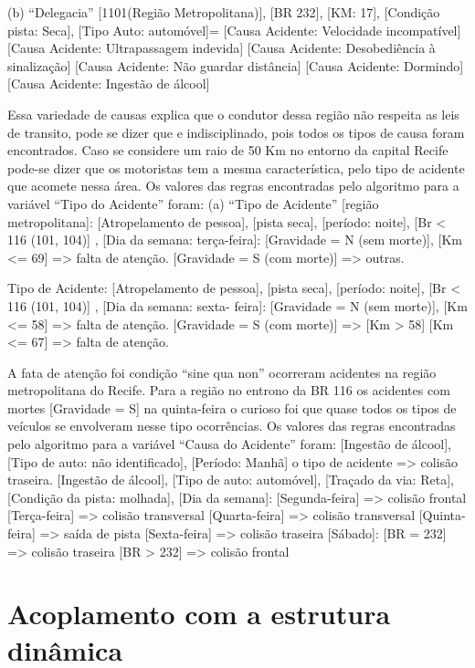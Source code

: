 (b) “Delegacia” [1101(Região Metropolitana)], [BR 232],
[KM: 17], [Condição pista: Seca], [Tipo Auto: automóvel]=
[Causa Acidente: Velocidade incompatível]
[Causa Acidente: Ultrapassagem indevida]
[Causa Acidente: Desobediência à sinalização]
[Causa Acidente: Não guardar distância]
[Causa Acidente: Dormindo]
[Causa Acidente: Ingestão de álcool]

Essa variedade de causas explica que o condutor dessa
região não respeita as leis de transito, pode se dizer que e
indisciplinado, pois todos os tipos de causa foram encontrados.
Caso se considere um raio de 50 Km no entorno da capital Recife pode-se dizer que os motoristas tem a mesma
característica, pelo tipo de acidente que acomete nessa área.
Os valores das regras encontradas pelo algoritmo para a
variável “Tipo do Acidente” foram:
(a) “Tipo de Acidente” [região metropolitana]: [Atropelamento
de pessoa], [pista seca], [período: noite], [Br < 116 (101, 104)]
, [Dia da semana: terça-feira]:
[Gravidade = N (sem morte)], [Km <= 69] => falta de atenção.
[Gravidade = S (com morte)] => outras.

Tipo de Acidente: [Atropelamento de pessoa], [pista seca],
[período: noite], [Br < 116 (101, 104)] , [Dia da semana: sexta-
feira]:
[Gravidade = N (sem morte)], [Km <= 58] => falta de atenção.
[Gravidade = S (com morte)] => [Km > 58] [Km <= 67] =>
falta de atenção.

A fata de atenção foi condição “sine qua non”
ocorreram acidentes na região metropolitana do Recife. Para a região no entrono da BR 116 os acidentes com
mortes [Gravidade = S] na quinta-feira o curioso foi que quase
todos os tipos de veículos se envolveram nesse tipo
ocorrências.
Os valores das regras encontradas pelo algoritmo para a
variável “Causa do Acidente” foram:
[Ingestão de álcool], [Tipo de auto: não identificado], [Período:
Manhã] o tipo de acidente => colisão traseira.
[Ingestão de álcool], [Tipo de auto: automóvel], [Traçado da
via: Reta], [Condição da pista: molhada], [Dia da semana]:
[Segunda-feira] => colisão frontal
[Terça-feira] => colisão transversal
[Quarta-feira] => colisão transversal
[Quinta-feira] => saída de pista
[Sexta-feira] => colisão traseira
[Sábado]: [BR = 232] => colisão traseira
	[BR > 232] => colisão frontal

\pagebreak

\section{Acoplamento com a estrutura dinâmica}

